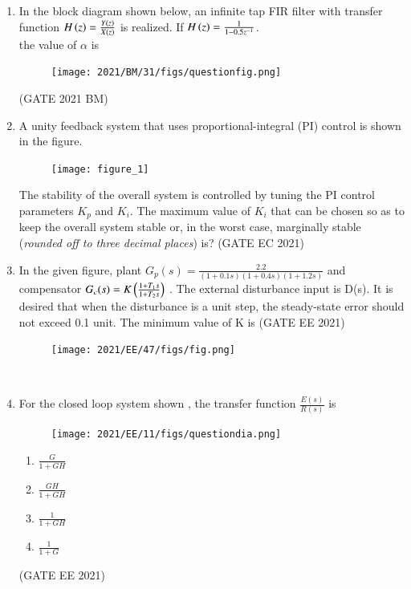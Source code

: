 \begin{enumerate}[label=\thechapter.\arabic*,ref=\thechapter.\theenumi]
\item In the block diagram shown below, an infinite tap FIR filter with transfer function $H\left(z\right)=\frac{Y\left(z\right)}{X\left(z\right)}$ is realized. If $H\left(z\right)=\frac{1}{1-0.5z^{-1}}$.\\the value of $\alpha$ is
\begin{figure}[h]
    \texttt{[image: 2021/BM/31/figs/questionfig.png]}
    \label{fig:question31bm}
\end{figure} \hfill(GATE 2021 BM)\\
\solution

\pagebreak
\item A unity feedback system that uses proportional-integral (PI) control is shown in the figure.
 \begin{figure}[!ht]    
    \centering
\graphicspath{ {2021/EC/48/figs} }
\texttt{[image: figure\_1]}
\label{figure:ee25-gate4-graph}
\end{figure}
The stability of the overall system is controlled by tuning the PI control parameters $K_p$ and $K_i$. The maximum value of $K_i$ that can be chosen so as to keep the overall system stable or, in the worst case, marginally stable (\textit{rounded off to three decimal places}) is?
\hfill{(GATE EC 2021)}\\
\solution

\pagebreak
\item In the given figure, plant $G_p(s)=\frac{2.2}{(1+0.1s)(1+0.4s)(1+1.2s)}$ and compensator $G_c(s)=K\left(\frac{1+T_1s}{1+T_2s}\right)$ . The external disturbance input is D(s). It is desired that when the disturbance is a unit step, the steady-state error should not exceed 0.1 unit. The minimum value of K is 
\hfill{(GATE EE 2021)}\\
\begin{figure}[h!]
    \centering
    \texttt{[image: 2021/EE/47/figs/fig.png]}
    \caption{}
    \label{fig:sr40}
\end{figure}
\\
\solution

\pagebreak
\item For the closed loop system shown , the transfer function $\frac{E(s)}{R(s)}$ is \\
\begin{figure}[ht]
	\centering
	\texttt{[image: 2021/EE/11/figs/questiondia.png]}
\end{figure}
\begin{enumerate}[label = (\alph*)]
	\item $\frac{G}{1+GH}$
	\item $\frac{GH}{1+GH}$
	\item $\frac{1}{1+GH}$
	\item $\frac{1}{1+G}$
\end{enumerate} \hfill{(GATE EE 2021)}\\

\pagebreak


\end{enumerate}
